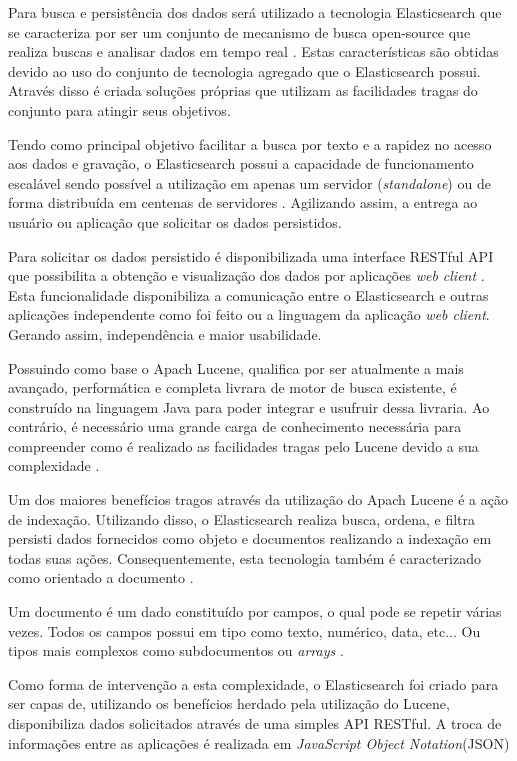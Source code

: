 Para busca e persistência dos dados será utilizado a tecnologia Elasticsearch que se caracteriza por ser um conjunto de mecanismo de busca open-source que realiza buscas e analisar dados em tempo real \cite{Gil:2010}. Estas características são obtidas devido ao uso do conjunto de tecnologia agregado que o Elasticsearch possui. Através disso é criada soluções próprias que utilizam as  facilidades tragas do conjunto para atingir seus objetivos.

Tendo como principal objetivo facilitar a busca por texto e a rapidez no acesso aos dados e gravação, o Elasticsearch possui a capacidade de funcionamento escalável sendo possível a utilização em apenas um servidor (\textit{standalone}) ou de forma distribuída em centenas de servidores \cite{Gormley:2015}. Agilizando assim, a entrega ao usuário ou aplicação que solicitar os dados persistidos.

Para solicitar os dados persistido é disponibilizada uma interface RESTful API que possibilita a obtenção e visualização dos dados por aplicações \textit{web client} \cite{Gormley:2015}. Esta funcionalidade disponibiliza a comunicação entre o Elasticsearch e outras aplicações independente como foi feito ou a linguagem da aplicação \textit{web client}. Gerando assim, independência e maior usabilidade.

Possuindo como base o Apach Lucene, qualifica por ser atualmente a mais avançado, performática e completa livrara de motor de busca existente, é construído na linguagem Java para poder integrar e usufruir dessa livraria. Ao contrário, é necessário uma grande carga de conhecimento necessária para compreender como é realizado as facilidades tragas pelo Lucene devido a sua complexidade \cite{Gormley:2015}.

Um dos maiores benefícios tragos através da utilização do Apach Lucene é a ação de indexação. Utilizando disso, o Elasticsearch realiza busca, ordena, e filtra persisti dados fornecidos como objeto e documentos realizando a indexação em todas suas ações. Consequentemente, esta tecnologia também é caracterizado como orientado a documento \cite{Gormley:2015}.

Um documento é um dado constituído por campos, o qual pode se repetir várias vezes. Todos os campos possui em tipo como texto, numérico, data, etc... Ou tipos mais complexos como subdocumentos ou \textit{arrays} \cite{Kuc:2013}.

Como forma de intervenção a esta complexidade, o Elasticsearch foi criado para  ser capas de, utilizando os benefícios herdado pela utilização do Lucene, disponibiliza dados solicitados através de uma simples API RESTful. A troca de informações entre as aplicações é realizada em \textit{JavaScript Object Notation}(JSON)
